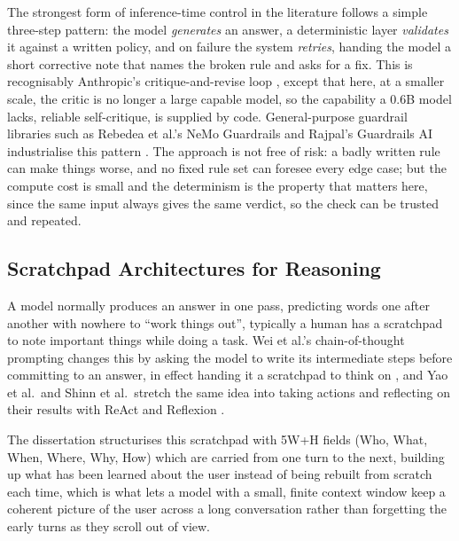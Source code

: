 The strongest form of inference-time control in the literature follows a simple three-step pattern: the model \emph{generates} an answer, a deterministic layer \emph{validates} it against a written policy, and on failure the system \emph{retries}, handing the model a short corrective note that names the broken rule and asks for a fix. This is recognisably Anthropic's critique-and-revise loop \cite{bai2022constitutionalaiharmlessnessai}, except that here, at a smaller scale, the critic is no longer a large capable model, so the capability a 0.6B model lacks, reliable self-critique, is supplied by code. General-purpose guardrail libraries such as Rebedea et al.'s NeMo Guardrails and Rajpal's Guardrails AI industrialise this pattern \cite{rebedea2023nemoguardrailstoolkitcontrollable, guardrailsai}. The approach is not free of risk: a badly written rule can make things worse, and no fixed rule set can foresee every edge case; but the compute cost is small and the determinism is the property that matters here, since the same input always gives the same verdict, so the check can be trusted and repeated.

\subsection{Scratchpad Architectures for Reasoning}
\label{subsec:scratchpad-architectures-for-reasoning}

A model normally produces an answer in one pass, predicting words one after another with nowhere to ``work things out'', typically a human has a scratchpad to note important things while doing a task. Wei et al.'s chain-of-thought prompting changes this by asking the model to write its intermediate steps before committing to an answer, in effect handing it a scratchpad to think on \cite{wei2023chainofthoughtpromptingelicitsreasoning}, and Yao et al.\ and Shinn et al.\ stretch the same idea into taking actions and reflecting on their results with ReAct and Reflexion \cite{yao2023reactsynergizingreasoningacting, shinn2023reflexionlanguageagentsverbal}. 

The dissertation structurises this scratchpad with 5W+H fields (Who, What, When, Where, Why, How) which are carried from one turn to the next, building up what has been learned about the user instead of being rebuilt from scratch each time, which is what lets a model with a small, finite context window keep a coherent picture of the user across a long conversation rather than forgetting the early turns as they scroll out of view. 

